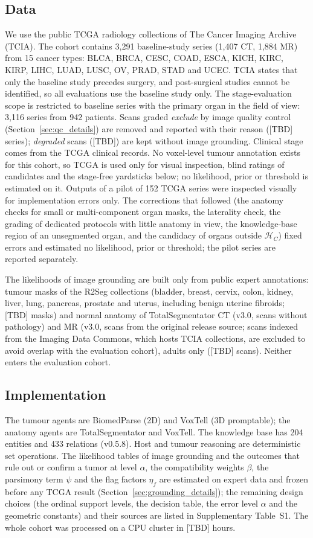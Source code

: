 \documentclass[fleqn,10pt]{olplainarticle}
\begin{document}
\subsection{Data}
We use the public TCGA radiology collections of The Cancer Imaging Archive (TCIA). The cohort contains 3{,}291
baseline-study series (1{,}407 CT, 1{,}884 MR) from 15 cancer types: BLCA, BRCA, CESC, COAD, ESCA, KICH, KIRC, KIRP,
LIHC, LUAD, LUSC, OV, PRAD, STAD and UCEC. TCIA states that only the baseline study precedes surgery, and post-surgical
studies cannot be identified, so all evaluations use the baseline study only. The stage-evaluation scope is restricted
to baseline series with the primary organ in the field of view: 3{,}116 series from 942 patients. Scans graded \emph{exclude} by image quality control (Section~\ref{sec:qc_details}) are removed and reported with their reason ([TBD] series); \emph{degraded} scans ([TBD]) are kept without image grounding. Clinical stage comes
from the TCGA clinical records. No voxel-level tumour annotation exists for this cohort, so TCGA is used only for visual
inspection, blind ratings of candidates and the stage-free yardsticks below; no likelihood, prior or threshold is estimated
on it. Outputs of a pilot of 152 TCGA series were inspected visually for implementation errors only. The corrections that
followed (the anatomy checks for small or multi-component organ masks, the laterality check, the grading of dedicated
protocols with little anatomy in view, the knowledge-base region of an unsegmented organ, and the candidacy of organs
outside $\mathcal{H}_C$) fixed errors and estimated no likelihood, prior or threshold; the pilot series are reported
separately.

The likelihoods of image grounding are built only from public expert annotations: tumour masks of the R2Seg collections
(bladder, breast, cervix, colon, kidney, liver, lung, pancreas, prostate and uterus, including benign uterine fibroids;
[TBD] masks) and normal anatomy of
TotalSegmentator CT (v3.0, scans without pathology) and MR (v3.0, scans from the original release source; scans indexed from the
Imaging Data Commons, which hosts TCIA collections, are excluded to avoid overlap with the evaluation cohort), adults only ([TBD] scans). Neither enters the evaluation cohort.

\subsection{Implementation}
The tumour agents are BiomedParse (2D) and VoxTell (3D promptable); the anatomy agents are TotalSegmentator and VoxTell. The
knowledge base has 204 entities and 433 relations (v0.5.8). Host and tumour reasoning are deterministic set operations.
The likelihood tables of image grounding and the outcomes that rule out or confirm a tumor at level $\alpha$, the
compatibility weights $\beta$, the parsimony term $\psi$ and the flag factors $\eta_f$ are estimated on expert data and frozen
before any TCGA result (Section~\ref{sec:grounding_details}); the remaining design choices (the ordinal support levels, the
decision table, the error level $\alpha$ and the geometric constants) and their sources are listed in Supplementary
Table~S1. The whole cohort was processed on a CPU cluster in [TBD] hours.
\end{document}
